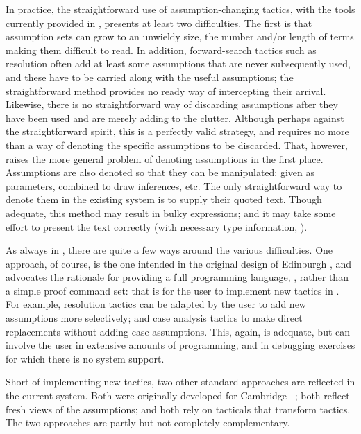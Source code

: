 In practice, the straightforward use of assumption-changing
tactics,
with the tools currently provided in \HOL, presents at
least two difficulties.  The first is that assumption sets can grow to an
unwieldy size, the number and/or length of terms making them difficult to
read.  In addition, forward-search tactics such as resolution often add at least
some assumptions that are never subsequently used, and these have to be
carried along with the useful assumptions; the straightforward
method provides no ready way of intercepting their arrival.
Likewise, there is no straightforward way of discarding
assumptions after they have been used and are merely adding to the clutter.
Although perhaps against the straightforward spirit, this is a perfectly valid
strategy, and
requires no more than a way of denoting
the specific assumptions to be discarded. That, however,
raises the more general problem of denoting assumptions in the first place.
Assumptions are also denoted
so that they can be
manipulated: given as parameters, combined to draw inferences, etc.  The only
straightforward way to denote them in the existing system is to supply
their quoted text.  Though adequate, this
method may result in bulky \ML{} expressions; and it may take some effort to present the text
correctly (with necessary type information, \etc).

As always in \HOL, there are quite a few ways around the various difficulties.
One approach, of course, is the one intended in the original
design of Edinburgh \LCF,
and advocates the rationale for providing a full programming language, \ML,
rather than a simple proof command set: that is for the user to
implement new tactics in \ML.  For example, resolution tactics can be adapted
by the user to add new assumptions more selectively; and case analysis tactics
to make direct replacements without adding case assumptions.
This, again, is adequate, but can involve the user in extensive amounts of
programming, and in debugging exercises for which there is no
system support.

Short of implementing new tactics, two other standard
approaches are reflected in the current system.  Both were originally
developed for Cambridge \LCF\ \cite{lcp-rewrite,new-LCF-man}; both reflect
fresh views of the assumptions; and both rely on tacticals that transform
tactics.  The two approaches are
partly but not completely complementary.

